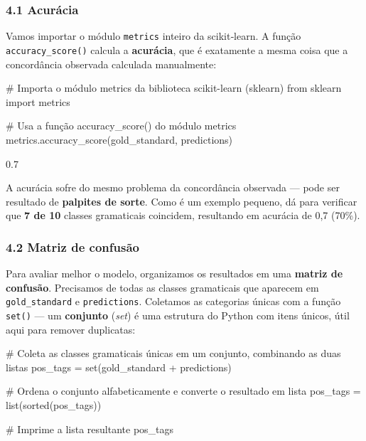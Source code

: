 \documentclass[
  brazilian,
  11pt,
]{article}
\newenvironment{Shaded}{\begin{snugshade}}{\end{snugshade}}
\newcommand{\BuiltInTok}[1]{\textcolor[rgb]{0.50,0.55,0.55}{#1}}
\newcommand{\CommentTok}[1]{\textcolor[rgb]{0.48,0.49,0.49}{#1}}
\newcommand{\ImportTok}[1]{\textcolor[rgb]{0.15,0.68,0.38}{#1}}
\newcommand{\NormalTok}[1]{\textcolor[rgb]{0.81,0.81,0.76}{#1}}
\newcommand{\OperatorTok}[1]{\textcolor[rgb]{0.81,0.81,0.76}{#1}}
\let\oldtexttt\texttt
\renewcommand{\texttt}[1]{{\color{inlink}\oldtexttt{#1}}}
\begin{document}
\subsubsection{4.1 Acurácia}\label{acuruxe1cia}

Vamos importar o módulo \texttt{metrics} inteiro da scikit‑learn. A
função \texttt{accuracy\_score()} calcula a \textbf{acurácia}, que é
exatamente a mesma coisa que a concordância observada calculada
manualmente:

\begin{Shaded}
\begin{Highlighting}[]
\CommentTok{\# Importa o módulo \textquotesingle{}metrics\textquotesingle{} da biblioteca scikit{-}learn (sklearn)}
\ImportTok{from}\NormalTok{ sklearn }\ImportTok{import}\NormalTok{ metrics}

\CommentTok{\# Usa a função accuracy\_score() do módulo \textquotesingle{}metrics\textquotesingle{}}
\NormalTok{metrics.accuracy\_score(gold\_standard, predictions)}
\end{Highlighting}
\end{Shaded}

\begin{Shaded}
\begin{Highlighting}[]
\NormalTok{0.7}
\end{Highlighting}
\end{Shaded}

A acurácia sofre do mesmo problema da concordância observada --- pode
ser resultado de \textbf{palpites de sorte}. Como é um exemplo pequeno,
dá para verificar que \textbf{7 de 10} classes gramaticais coincidem,
resultando em acurácia de 0,7 (70\%).

\subsubsection{4.2 Matriz de confusão}\label{matriz-de-confusuxe3o}

Para avaliar melhor o modelo, organizamos os resultados em uma
\textbf{matriz de confusão}. Precisamos de todas as classes gramaticais
que aparecem em \texttt{gold\_standard} e \texttt{predictions}.
Coletamos as categorias únicas com a função \texttt{set()} --- um
\textbf{conjunto} (\emph{set}) é uma estrutura do Python com itens
únicos, útil aqui para remover duplicatas:

\begin{Shaded}
\begin{Highlighting}[]
\CommentTok{\# Coleta as classes gramaticais únicas em um conjunto, combinando as duas listas}
\NormalTok{pos\_tags }\OperatorTok{=} \BuiltInTok{set}\NormalTok{(gold\_standard }\OperatorTok{+}\NormalTok{ predictions)}

\CommentTok{\# Ordena o conjunto alfabeticamente e converte o resultado em lista}
\NormalTok{pos\_tags }\OperatorTok{=} \BuiltInTok{list}\NormalTok{(}\BuiltInTok{sorted}\NormalTok{(pos\_tags))}

\CommentTok{\# Imprime a lista resultante}
\NormalTok{pos\_tags}
\end{Highlighting}
\end{Shaded}
\end{document}
